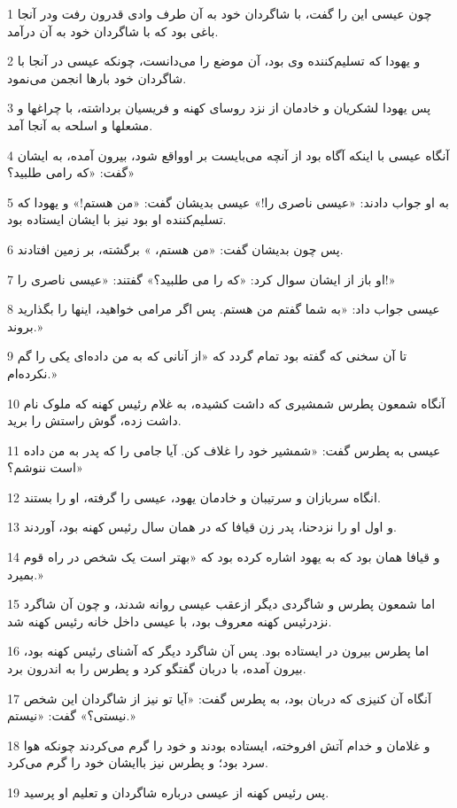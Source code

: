 \par 1 چون عیسی این را گفت، با شاگردان خود به آن طرف وادی قدرون رفت ودر آنجا باغی بود که با شاگردان خود به آن درآمد.
\par 2 و یهودا که تسلیم‌کننده وی بود، آن موضع را می‌دانست، چونکه عیسی در آنجا با شاگردان خود بارها انجمن می‌نمود.
\par 3 پس یهودا لشکریان و خادمان از نزد روسای کهنه و فریسیان برداشته، با چراغها و مشعلها و اسلحه به آنجا آمد.
\par 4 آنگاه عیسی با اینکه آگاه بود از آنچه می‌بایست بر اوواقع شود، بیرون آمده، به ایشان گفت: «که رامی طلبید؟»
\par 5 به او جواب دادند: «عیسی ناصری را!» عیسی بدیشان گفت: «من هستم!» و یهودا که تسلیم‌کننده او بود نیز با ایشان ایستاده بود.
\par 6 پس چون بدیشان گفت: «من هستم، » برگشته، بر زمین افتادند.
\par 7 او باز از ایشان سوال کرد: «که را می طلبید؟» گفتند: «عیسی ناصری را!»
\par 8 عیسی جواب داد: «به شما گفتم من هستم. پس اگر مرامی خواهید، اینها را بگذارید بروند.»
\par 9 تا آن سخنی که گفته بود تمام گردد که «از آنانی که به من داده‌ای یکی را گم نکرده‌ام.»
\par 10 آنگاه شمعون پطرس شمشیری که داشت کشیده، به غلام رئیس کهنه که ملوک نام داشت زده، گوش راستش را برید.
\par 11 عیسی به پطرس گفت: «شمشیر خود را غلاف کن. آیا جامی را که پدر به من داده است ننوشم؟»
\par 12 انگاه سربازان و سرتیبان و خادمان یهود، عیسی را گرفته، او را بستند.
\par 13 و اول او را نزدحنا، پدر زن قیافا که در همان سال رئیس کهنه بود، آوردند.
\par 14 و قیافا همان بود که به یهود اشاره کرده بود که «بهتر است یک شخص در راه قوم بمیرد.»
\par 15 اما شمعون پطرس و شاگردی دیگر ازعقب عیسی روانه شدند، و چون آن شاگرد نزدرئیس کهنه معروف بود، با عیسی داخل خانه رئیس کهنه شد.
\par 16 اما پطرس بیرون در ایستاده بود. پس آن شاگرد دیگر که آشنای رئیس کهنه بود، بیرون آمده، با دربان گفتگو کرد و پطرس را به اندرون برد.
\par 17 آنگاه آن کنیزی که دربان بود، به پطرس گفت: «آیا تو نیز از شاگردان این شخص نیستی؟» گفت: «نیستم.»
\par 18 و غلامان و خدام آتش افروخته، ایستاده بودند و خود را گرم می‌کردند چونکه هوا سرد بود؛ و پطرس نیز باایشان خود را گرم می‌کرد.
\par 19 پس رئیس کهنه از عیسی درباره شاگردان و تعلیم او پرسید.

